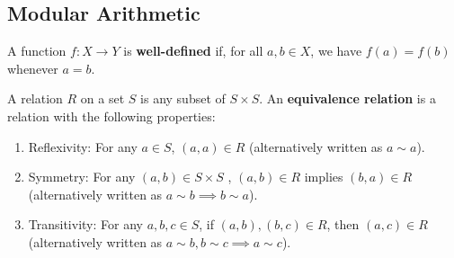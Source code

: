 \documentclass [12pt] {article}
\newenvironment{definition}[1]{\begin{tcolorbox}[title={Definition: #1},colback=blue!5!white,colframe=black!75!blue]}{\end{tcolorbox}}
\renewcommand{\bf}[1]{\textbf{{#1}}}
\begin{document}
\subsection{Modular Arithmetic}
\begin{definition}{Well-Defined Functions}
    A function $f : X \to Y$ is \bf{well-defined} if, for all $a, b \in X$, we have $f(a) = f(b)$
    whenever $a = b$.
\end{definition}

\begin{definition}{Equivalence Relation}
    A relation $R$ on a set $S$ is any subset of $S \times S$.
    An \bf{equivalence relation} is a relation with the following properties:
    \begin{enumerate}
        \item Reflexivity: For any $a \in S$, $(a, a) \in R$ (alternatively written as $a \sim a$).
        \item Symmetry: For any $(a, b) \in S \times S$ , $(a, b) \in R$ implies $(b, a) \in R$
            (alternatively written as $a \sim b \implies b \sim a$).
        \item Transitivity: For any $a, b, c \in S$, if $(a, b), (b, c) \in R$, then $(a, c) \in R$
            (alternatively written as $a \sim b, b \sim c \implies a \sim c$).
    \end{enumerate}
\end{definition}
\end{document}
